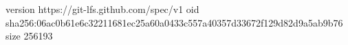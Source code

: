 version https://git-lfs.github.com/spec/v1
oid sha256:06ac0b61e6c32211681ec25a60a0433c557a40357d33672f129d82d9a5ab9b76
size 256193
